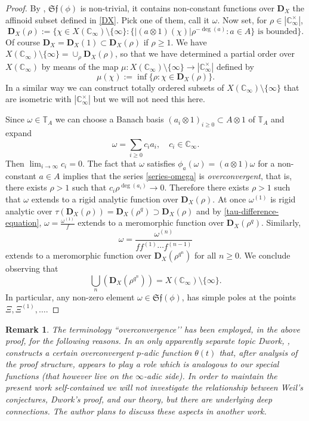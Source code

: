 \documentclass[11pt]{amsart}
\numberwithin{equation}{section}
\newcommand{\CC}{\mathbb{C}}
\newcommand{\TT}{\mathbb{T}}
\newtheorem{Remark}[Theorem]{Remark}
\begin{document}
\begin{proof}
By \cite[Theorem 3.11]{GAZ&MAU}, $\mathfrak{Sf}(\phi)$ is non-trivial, it contains non-constant functions
over $\boldsymbol{D}_X$ the affinoid subset defined in \eqref{DX}. Pick one of them, call it $\omega$. 
Now set, for $\rho\in|\CC_\infty^\times|$, 
$$\boldsymbol{D}_X(\rho):=\{\chi\in X(\CC_\infty)\setminus\{\infty\}:\{|(a\otimes 1)(\chi)|\rho^{-\deg(a)}:a\in A\}\text{ is bounded}\}.$$
Of course $\boldsymbol{D}_X=\boldsymbol{D}_X(1)\subset\boldsymbol{D}_X(\rho)$ if $\rho\geq1$. 
We have $X(\CC_\infty)\setminus\{\infty\}=\cup_\rho\boldsymbol{D}_X(\rho)$, so that we have determined a partial order 
over $X(\CC_\infty)$ by means of the map $\mu:X(\CC_\infty)\setminus\{\infty\}\rightarrow|\CC_\infty^\times|$
defined by $$\mu(\chi):=\inf\{\rho:\chi\in\boldsymbol{D}_X(\rho)\}.$$ In a similar way we can construct totally ordered 
subsets of $X(\CC_\infty)\setminus\{\infty\}$ that are isometric with $|\CC_\infty^\times|$ but we will not need this here.

Since $\omega\in\TT_A$ we can choose a Banach basis $(a_i\otimes1)_{i\geq0}\subset A\otimes1$ of $\TT_A$ and expand 
\begin{equation} \label{series-omega}
\omega=\sum_{i\geq0}c_ia_i,\quad c_i\in\CC_\infty.
\end{equation} Then $\lim_{i\rightarrow\infty}c_i=0$.
The fact that 
$\omega$ satisfies $\phi_a(\omega)=(a\otimes1)\omega$ for a non-constant $a\in A$ implies that the series \eqref{series-omega} is {\em overconvergent}, that is, 
there exists $\rho>1$ such that $c_i\rho^{\deg(a_i)}\rightarrow0$. Therefore there exists $\rho>1$ such that 
$\omega$ extends to a rigid analytic function over $\boldsymbol{D}_X(\rho)$. At once $\omega^{(1)}$ is rigid analytic over
 $\tau(\boldsymbol{D}_X(\rho))=\boldsymbol{D}_X(\rho^q)\supset \boldsymbol{D}_X(\rho)$ and by \eqref{tau-difference-equation}, $\omega=\frac{\omega^{(1)}}{f}$ extends to a meromorphic function over $\boldsymbol{D}_X(\rho^q)$. Similarly,
 $$\omega=\frac{\omega^{(n)}}{ff^{(1)}\cdots f^{(n-1)}}$$ extends to a meromorphic function over $\boldsymbol{D}_X(\rho^{q^n})$ for all $n\geq0$. We conclude observing that $$\bigcup_n(\boldsymbol{D}_X(\rho^{q^n}))=X(\CC_\infty)\setminus\{\infty\}.$$
 In particular, any non-zero element $\omega\in\mathfrak{Sf}(\phi)$, has simple poles at the points $\Xi,\Xi^{(1)},\ldots$.
\end{proof}

\begin{Remark}{\em The terminology ``overconvergence’’ has been employed, in the above proof, for the following reasons. In an only apparently separate topic Dwork, \cite[Discussion around (5)]{DWO}, constructs a certain overconvergent $p$-adic function $\theta(t)$ that, after analysis of the proof structure, appears to play a role which is analogous to our special functions (that however live on the $\infty$-adic side). In order to maintain the present work self-contained we will not investigate the relationship between Weil’s conjectures, Dwork’s proof, and our theory, but there are underlying deep connections. The author plans to discuss these aspects in another work.}\end{Remark}
\end{document}
